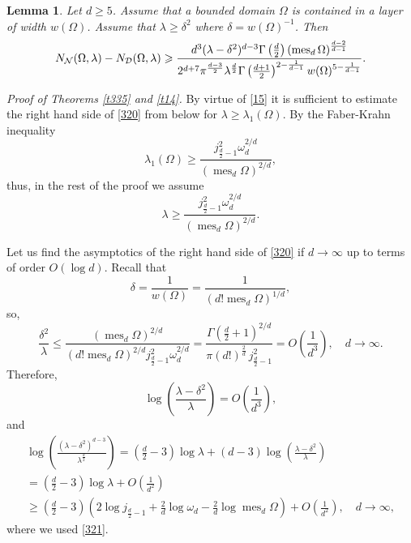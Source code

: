 \documentclass[a4paper,12pt]{article}
\numberwithin{equation}{section}
\def \de{\delta}
\def \la{\lambda}
\def \oo{\omega}
\def \G{\Gamma}
\def \O{\Omega}
\def\mes{\operatorname{mes}}
\newcommand{\<}{\langle}
\renewcommand{\>}{\rangle}
\theoremstyle{plain}
\newtheorem{lemma}[theorem]{\bf Lemma}
\theoremstyle{definition}
\theoremstyle{remark}
\renewcommand{\le}{\leqslant}
\renewcommand{\ge}{\geqslant}
\begin{document}
\begin{lemma}
\label{l320}
Let $d\ge 5$. 
Assume that a bounded domain $\O$ is contained in a layer of width $w(\O)$.
Assume that $\la \ge \de^2$ where $\de = w(\O)^{-1}$.
Then
\begin{equation}
\label{320}
N_{\cal N} (\O, \la) - N_{\cal D} (\O, \la) \ge
\frac{d^3 (\la-\de^2)^{d-3} \G\left(\frac{d}2\right) (\mes_d \O)^{\frac{d-2}{d-1}}}
{2^{d+7} \pi^{\frac{d-3}2} \la^{\frac{d}2} 
\G \left(\frac{d+1}2\right)^{2 - \frac1{d-1}} w(\O)^{5 - \frac1{d-1}}}.
\end{equation}
\end{lemma}
 
{\it Proof of Theorems \ref{t335} and \ref{t14}.}
By virtue of \eqref{15} it is sufficient to estimate the right hand side of \eqref{320}
from below for $\la \ge \la_1 (\O)$.
By the Faber-Krahn inequality
$$
\la_1 (\O) \ge \frac{j_{\frac{d}2-1}^2 \oo_d^{2/d}}{(\mes_d \O)^{2/d}},
$$
thus, in the rest of the proof we assume
\begin{equation}
\label{321}
\la \ge \frac{j_{\frac{d}2-1}^2 \oo_d^{2/d}}{(\mes_d \O)^{2/d}}.
\end{equation}

Let us find the asymptotics of the right hand side of \eqref{320}
if $d \to \infty$ up to terms of order $O (\log d)$.
Recall that 
$$
\de = \frac1{w(\O)} = \frac1{\left(d! \mes_d \O\right)^{1/d}},
$$
so,
$$
\frac{\de^2}\la \le \frac{(\mes_d \O)^{2/d}}
{\left(d! \mes_d \O\right)^{2/d} j_{\frac{d}2-1}^2 \oo_d^{2/d}}
= \frac{\G\left(\frac{d}2 + 1\right)^{2/d}}{\pi (d!)^{\frac2d} \,j_{\frac{d}2-1}^2}
= O \left(\frac1{d^3}\right), \quad d\to \infty.
$$
Therefore,
$$
\log \left(\frac{\la-\de^2}\la\right) = O \left(\frac1{d^3}\right),
$$
and
\begin{eqnarray}
\nonumber
\log \left(\frac{(\la-\de^2)^{d-3}}{\la^{\frac{d}2}}\right) 
= \left(\frac{d}2 - 3\right) \log \la + (d-3) \log \left(\frac{\la-\de^2}\la\right)\\
\label{322}
= \left(\frac{d}2 - 3\right) \log \la + O \left(\frac1{d^2}\right) \\
\ge \left(\frac{d}2 - 3\right)
\left(2 \log j_{\frac{d}2-1} + \frac2d \log \oo_d - \frac2d \log \mes_d \O\right)
+ O \left(\frac1{d^2}\right), \quad d\to \infty,
\nonumber
\end{eqnarray}
where we used \eqref{321}.
\end{document}
